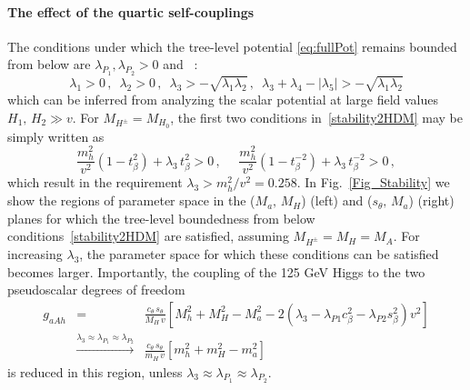 \paragraph{The effect of the quartic self-couplings  }

    The conditions under which the tree-level potential \eqref{eq:fullPot} remains bounded from below are $\lambda_{P_1}, \lambda_{P_2}>0$ and ~\cite{Gunion:2002zf}:
    \begin{equation}
    \label{stability2HDM}
     \lambda_1 > 0\,, \,\,\, \lambda_2 > 0\,, \,\,\, \lambda_3 > - \sqrt{\lambda_1 \lambda_2} \,, \,\,\, \lambda_3 + \lambda_4 - |\lambda_5| > - \sqrt{\lambda_1 \lambda_2} 
    \end{equation}
    which can be inferred from analyzing the scalar potential at large field values $H_1,\,H_2 \gg v$. For $M_{H^{\pm}} = M_{H_0}$, the first two conditions 
    in~\eqref{stability2HDM} may be simply written as
    \begin{equation}
     \frac{m_h^2}{v^2} (1-t_{\beta}^{2}) + \lambda_3 \, t_{\beta}^{2} > 0\,, \quad\,\, \frac{m_h^2}{v^2} (1-t_{\beta}^{-2}) + \lambda_3 \, t_{\beta}^{-2} > 0\,,
     \end{equation}
    which result in the requirement $\lambda_3 > m_h^2/v^2 = 0.258$. In Fig.~\ref{Fig_Stability} we show the regions of parameter space in the 
    ($M_a,\, M_{H}$) (left) and ($s_{\theta},\, M_a$) (right) planes for which the tree-level boundedness from below conditions~\eqref{stability2HDM}
    are satisfied, assuming $M_{H^{\pm}} = M_{H} = M_{A}$. For increasing $\lambda_3$, the parameter space for which these conditions can be satisfied becomes larger. Importantly, the coupling of the 125 GeV Higgs to the two pseudoscalar degrees of freedom
        \begin{eqnarray}
     g_{aAh} &=& \frac{c_{\theta} \,s_{\theta}}{M_{H} \,v} \left[M_h^2 + M_H^2 -M_a^2 - 2 
     (\lambda_3 - \lambda_{P1} c_{\beta}^2 - \lambda_{P2} s_{\beta}^2) v^2 \right] \nonumber \\
     &\stackrel{\lambda_3\approx \lambda_{P_1}\approx \lambda_{P_2}}{\longrightarrow}& \frac{c_{\theta} \,s_{\theta}}{m_{H} \,v} \left[m_h^2 + m_H^2 -m_a^2 \right] 
    \end{eqnarray}
     is reduced in this region, unless $\lambda_3\approx \lambda_{P_1}\approx \lambda_{P_2}$. 
